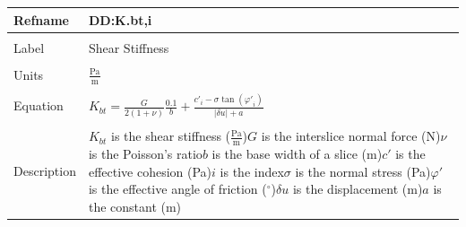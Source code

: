 \documentclass[12pt]{article}
\begin{document}
\noindent \begin{minipage}{\textwidth}
\begin{tabular}{p{} p{}}
\toprule \textbf{Refname} & \textbf{DD:K.bt,i}
\label{DD:K.bt,i}
\\ \midrule \\
Label & Shear Stiffness
\\ \midrule \\
Units & $\frac{\text{Pa}}{\text{m}}$
\\ \midrule \\
Equation & ${K_{bt}}=\frac{G}{2 \left(1+ν\right)} \frac{0.1}{b}+\frac{{c'}_{i}-σ \tan\left({φ'}_{i}\right)}{|δu|+a}$
\\ \midrule \\
Description & ${K_{bt}}$ is the shear stiffness ($\frac{\text{Pa}}{\text{m}}$)\newline$G$ is the interslice normal force (N)\newline$ν$ is the Poisson's ratio\newline$b$ is the base width of a slice (m)\newline$c'$ is the effective cohesion (Pa)\newline$i$ is the index\newline$σ$ is the normal stress (Pa)\newline$φ'$ is the effective angle of friction (${}^{\circ}$)\newline$δu$ is the displacement (m)\newline$a$ is the constant (m)
\\ \bottomrule \end{tabular}
\end{minipage}\\
~\newline
\end{document}
